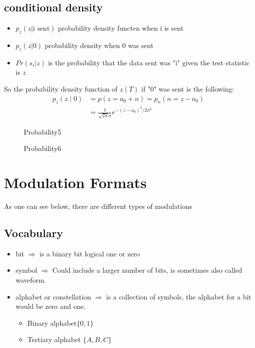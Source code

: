 \subsection{conditional density}
\begin{itemize}
\item $p_z(z\rvert \text{i sent})$ probability density functen when i is sent
\item $p_z(z\rvert 0)$ probability density when 0 was sent
\item $Pr(s_i \rvert z)$ is the probability that the data sent was "i" given the test statistic is $z$
\end{itemize}
So the probability density function of $z(T)$ if "0" was sent is the following:
$$
\begin{aligned}
p_z(z \mid 0) &=p\left(z=a_0+n\right)=p_n\left(n=z-a_0\right) \\
&=\frac{1}{\sqrt{2 \pi} \sigma} e^{-\left(z-a_0\right)^2 / 2 \sigma^2}
\end{aligned}
$$
\begin{figure}[ht]
  \centering
  \caption{Probability5}
  \label{fig:probability_5}
\end{figure}
\begin{figure}[ht]
  \centering
  \caption{Probability6}
  \label{fig:probability_6}
\end{figure}
\section{Modulation Formats}
As one can see below, there are different types of modulations
\subsection{Vocabulary}
\begin{itemize}
\item bit $\Rightarrow$ is a binary bit logical one or zero
\item symbol $\Rightarrow$ Could include a larger number of bits, is sometimes also called waveform.
\item alphabet or constellation $\Rightarrow$ is a collection of symbols, the alphabet for a bit would be zero and one.
\begin{itemize}
\item Binary alphabet$\{0,1\}$
\item Tertiary alphabet $\{A,B,C\}$
\end{itemize}
\end{itemize}

